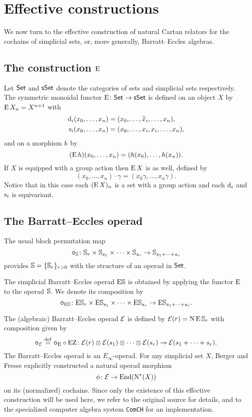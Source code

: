
\section{Effective constructions}\label{s:effective}

\noindent We now turn to the effective construction of natural Cartan relators for the cochains of simplicial sets, or, more generally, Barratt--Eccles algebras.

\subsection{The construction $\operatorname{E}$}

Let $\mathsf{Set}$ and $\mathsf{sSet}$ denote the categories of sets and simplicial sets respectively.
The symmetric monoidal functor $\operatorname{E} \colon \mathsf{Set} \to \mathsf{sSet}$ is defined on an object $X$ by $\operatorname{E} X_n = X^{n+1}$ with
\[
\begin{split}
	\operatorname{d}_i(x_0,\dots,x_n) &= (x_0,\dots,\widehat{x}_i,\dots,x_n), \\
	\operatorname{s}_i(x_0,\dots,x_n) &= (x_0, \dots, x_i, x_i, \dots, x_n),
\end{split}
\]
and on a morphism $h$ by
\[
(\operatorname{E} h)(x_0,\dots,x_n) = (h(x_0),\dots,h(x_n)).
\]
If $X$ is equipped with a group action then $\operatorname{E} X$ is as well, defined by
\[
(x_0,\dots,x_n) \cdot \gamma = (x_0 \gamma, \dots, x_n \gamma).
\]
Notice that in this case each $(\operatorname{E} X)_n$ is a set with a group action and each $\operatorname{d}_i$ and $\operatorname{s}_i$ is equivariant.

\subsection{The Barratt--Eccles operad}\label{ss:barratt-eccles}

The usual block permutation map
\[
\bm{\mathbin{\circ}}_{\mathbb{S}} \colon \mathbb{S}_r \times \mathbb{S}_{s_1} \times \cdots \times \mathbb{S}_{s_r} \to \mathbb{S}_{s_1+\dots+s_r}
\]
provides $\mathbb{S} = \{\mathbb{S}_r\}_{r>0}$ with the structure of an operad in $\mathsf{Set}$.

The simplicial Barratt--Eccles operad $\mathrm{E}\mathbb{S}$ is obtained by applying the functor $\operatorname{E}$ to the operad $\mathbb{S}$.
We denote its composition by
\[
\bm{\mathbin{\circ}}_{\mathrm{E}\mathbb{S}} \colon
\mathrm{E}\mathbb{S}_r \times \mathrm{E}\mathbb{S}_{s_1} \times\dots\times \mathrm{E}\mathbb{S}_{s_r} \to
\mathrm{E}\mathbb{S}_{s_1+\dots+s_r}.
\]

The (algebraic) Barratt--Eccles operad $\mathcal{E}$ is defined by $\mathcal{E}(r) = \operatorname{N}\operatorname{E}\mathbb{S}_r$ with composition given by
\[
\bm{\mathbin{\circ}}_{\mathcal{E}} \stackrel{\mathrm{def}}{=} \bm{\mathbin{\circ}}_{\operatorname{E}} \mathbin{\circ} \operatorname{EZ} \colon \mathcal{E}(r) \otimes \mathcal{E}(s_1) \otimes\dotsb\otimes \mathcal{E}(s_r) \to \mathcal{E}(s_1+\dots+s_r).
\]
The Barratt--Eccles operad is an $E_\infty$-operad.
For any simplicial set $X$, Berger and Fresse \cite{berger2004combinatorial} explicitly constructed a natural operad morphism
\[
\phi \colon \mathcal{E} \to \mathrm{End}(\operatorname{N^{\ast}}(X))
\]
on its (normalized) cochains.
Since only the existence of this effective construction will be used here, we refer to the original source for details, and to the specialized computer algebra system \texttt{ComCH} for an implementation.

